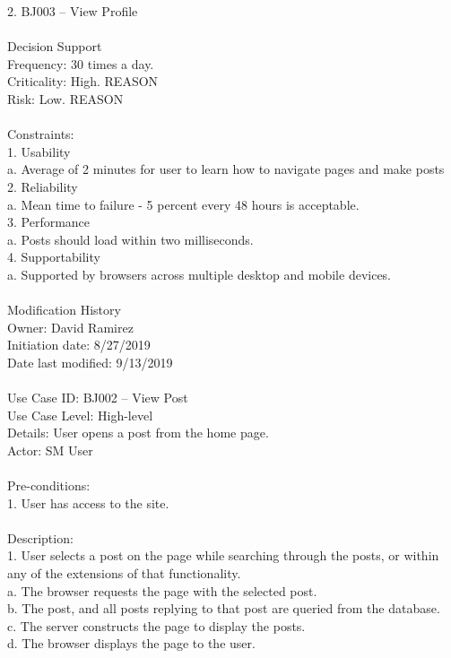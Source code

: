 \documentclass{report}
\begin{document}
2.	BJ003 – View Profile\\
\\
Decision Support\\
     Frequency: 30 times a day.\\
     Criticality: High. REASON\\
     Risk: Low. REASON\\
\\
Constraints:\\
1.	Usability\\
	a.	Average of 2 minutes for user to learn how to navigate pages and make posts\\
2.	Reliability\\
	a.	Mean time to failure - 5 percent every 48 hours is acceptable.\\
3.	Performance\\
	a.	Posts should load within two milliseconds.\\
4.	Supportability\\
	a.	Supported by browsers across multiple desktop and mobile devices.\\
\\
Modification History\\
     Owner: David Ramirez\\
     Initiation date: 8/27/2019\\
     Date last modified: 9/13/2019\\
\\
Use Case ID: BJ002 – View Post\\
Use Case Level: High-level\\
Details: User opens a post from the home page.\\
Actor: SM User\\
\\
Pre-conditions:\\
1.	User has access to the site.\\
\\
Description: \\
1. User selects a post on the page while searching through the posts, or within any of the extensions of that functionality.\\
a.	The browser requests the page with the selected post.\\
b.	The post, and all posts replying to that post are queried from the database.\\
c.	The server constructs the page to display the posts.\\
d.	The browser displays the page to the user.\\
\end{document}
